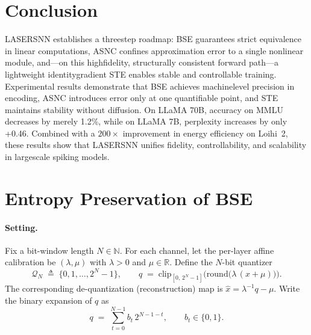 \documentclass{article}
\theoremstyle{plain}
\theoremstyle{definition}
\theoremstyle{remark}
\begin{document}

\section{Conclusion}
\label{sec:conclusion}
LASER\textendash SNN establishes a three\textendash step roadmap: BSE guarantees strict equivalence in linear computations, ASNC confines approximation error to a single nonlinear module, and—on this high\textendash fidelity, structurally consistent forward path—a lightweight identity\textendash gradient STE enables stable and controllable training. Experimental results demonstrate that BSE achieves machine\textendash level precision in encoding, ASNC introduces error only at one quantifiable point, and STE maintains stability without diffusion. On \mbox{LLaMA} 70B, accuracy on MMLU decreases by merely 1.2\%, while on \mbox{LLaMA} 7B, perplexity increases by only {+}0.46. Combined with a $200\times$ improvement in energy efficiency on Loihi~2, these results show that LASER\textendash SNN unifies fidelity, controllability, and scalability in large\textendash scale spiking models.




\appendix
\section{Entropy Preservation of BSE}
\label{app:bse_entropy_proof}

\paragraph{Setting.}
Fix a bit-window length $N\in\mathbb{N}$. For each channel, let the per-layer affine calibration be $(\lambda,\mu)$ with $\lambda>0$ and $\mu\in\mathbb{R}$. Define the $N$-bit quantizer
\begin{equation}
\label{eq:quantizer_grid_def}
\mathcal{Q}_N \;\triangleq\; \{0,1,\dots,2^{N}-1\}, 
\qquad 
q \;=\; \mathrm{clip}_{[0,\,2^N-1]}\!\Big(\mathrm{round}\big(\lambda\,(x+\mu)\big)\Big).
\end{equation}
The corresponding de-quantization (reconstruction) map is $\hat{x}=\lambda^{-1}q-\mu$.
Write the binary expansion of $q$ as
\begin{equation}
\label{eq:binary_expansion_def}
q \;=\; \sum_{t=0}^{N-1} b_t\,2^{N-1-t},
\qquad b_t\in\{0,1\}.
\end{equation}
\end{document}
